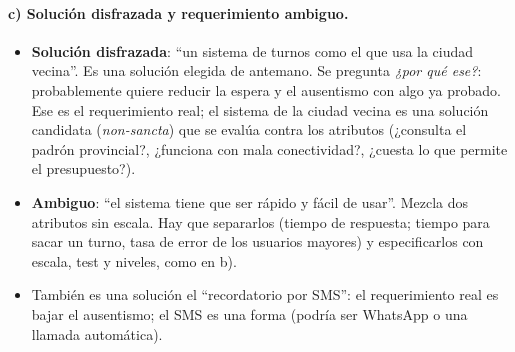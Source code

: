 \documentclass[11pt,a4paper]{article}
\begin{document}
\paragraph{c) Solución disfrazada y requerimiento ambiguo.}
\begin{itemize}
  \item \textbf{Solución disfrazada}: ``un sistema de turnos como el que usa la ciudad vecina''. Es una solución
  elegida de antemano. Se pregunta \emph{¿por qué ese?}: probablemente quiere reducir la espera y el ausentismo
  con algo ya probado. Ese es el requerimiento real; el sistema de la ciudad vecina es una solución candidata
  (\emph{non-sancta}) que se evalúa contra los atributos (¿consulta el padrón provincial?, ¿funciona con mala
  conectividad?, ¿cuesta lo que permite el presupuesto?).
  \item \textbf{Ambiguo}: ``el sistema tiene que ser rápido y fácil de usar''. Mezcla dos atributos sin escala.
  Hay que separarlos (tiempo de respuesta; tiempo para sacar un turno, tasa de error de los usuarios mayores) y
  especificarlos con escala, test y niveles, como en b).
  \item También es una solución el ``recordatorio por SMS'': el requerimiento real es bajar el ausentismo; el SMS
  es una forma (podría ser WhatsApp o una llamada automática).
\end{itemize}
\end{document}
